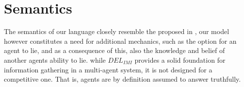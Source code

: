 \section{Semantics}
The semantics of our language closely resemble the proposed in \cite{delimi},
our model however constitutes a need for additional mechanics, such as the
option for an agent to lie, and as a consequence of this, also the knowledge
and belief of another agents ability to lie. while $DEL_{IMI}$ provides a solid
foundation for information gathering in a multi-agent system, it is not
designed for a competitive one. That is, agents are by definition assumed to
answer truthfully.